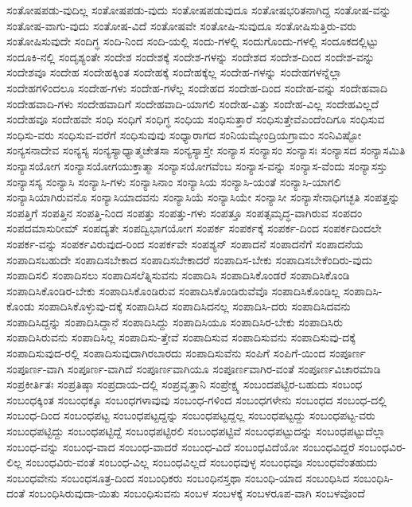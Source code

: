 {ಸಂತೋಷಪಡು-ವುದಿಲ್ಲ
ಸಂತೋಷಪಡು-ವುದು
ಸಂತೋಷಪಡುವುದೂ
ಸಂತೋಷಭರಿತನಾಗಿದ್ದ
ಸಂತೋಷ-ವನ್ನು
ಸಂತೋಷ-ವಾಗು-ವುದು
ಸಂತೋಷ-ವಿದೆ
ಸಂತೋಷವೇ
ಸಂತೋಷಿ-ಸುವುದೂ
ಸಂತೋಷಿಸುತ್ತಿರು-ವರು
ಸಂತೋಷಿಸುವುದೇ
ಸಂದಿಗ್ಧ
ಸಂದಿ-ನಿಂದ
ಸಂದಿ-ಯಲ್ಲಿ
ಸಂದು-ಗಳಲ್ಲಿ
ಸಂದುಗೊಂದು-ಗಳಲ್ಲಿ
ಸಂದೂಕದಲ್ಲಿಟ್ಟು
ಸಂದೂಕಿ-ನಲ್ಲಿ
ಸಂದೃಶ್ಯಂತೇ
ಸಂದೇಶ
ಸಂದೇಶಕ್ಕೆ
ಸಂದೇಶ-ಗಳನ್ನು
ಸಂದೇಶದ
ಸಂದೇಶ-ದಿಂದ
ಸಂದೇಶ-ವನ್ನು
ಸಂದೇಶವೂ
ಸಂದೇಹ
ಸಂದೇಹಕ್ಕಿಂತ
ಸಂದೇಹಕ್ಕೆ
ಸಂದೇಹಕ್ಕೆಲ್ಲ
ಸಂದೇಹ-ಗಳನ್ನು
ಸಂದೇಹಗಳನ್ನೆಲ್ಲಾ
ಸಂದೇಹಗಳಿಂದಲೂ
ಸಂದೇಹ-ಗಳು
ಸಂದೇಹ-ಗಳೆಲ್ಲ
ಸಂದೇಹದ
ಸಂದೇಹ-ದಿಂದ
ಸಂದೇಹ-ವನ್ನು
ಸಂದೇಹವಾದಿ
ಸಂದೇಹವಾದಿ-ಗಳು
ಸಂದೇಹವಾದಿಗೆ
ಸಂದೇಹವಾದಿ-ಯಾಗಲಿ
ಸಂದೇಹ-ವಿತ್ತು
ಸಂದೇಹ-ವಿಲ್ಲ
ಸಂದೇಹವಿಲ್ಲದೆ
ಸಂದೇಹವೂ
ಸಂದೇಹವೇ
ಸಂಧಿ
ಸಂಧಿಗೆ
ಸಂಧಿಗ್ಧ
ಸಂಧಿಯ
ಸಂಧಿಸುತ್ತಾರೆ
ಸಂಧಿಸುತ್ತೇವೆಎಂದೆಂದಿಗೂ
ಸಂಧಿಸುವ
ಸಂಧಿಸು-ವರು
ಸಂಧಿಸುವ-ವರೆಗೆ
ಸಂಧಿಸುವುವು
ಸಂಧ್ಯಾರಾಗದ
ಸಂನಿಯಮ್ಯೇಂದ್ರಿಯಗ್ರಾಮಂ
ಸಂನಿವಿಷ್ಟೋ
ಸಂನ್ಯಸನಾದೇವ
ಸಂನ್ಯಸ್ಯ
ಸಂನ್ಯಸ್ಯಾಧ್ಯಾತ್ಮಚೇತಸಾ
ಸಂನ್ಯಸ್ಯಾಸ್ತೇ
ಸಂನ್ಯಾಸ
ಸಂನ್ಯಾಸಂ
ಸಂನ್ಯಾಸಃ
ಸಂನ್ಯಾಸದ
ಸಂನ್ಯಾಸಮಿತಿ
ಸಂನ್ಯಾಸಯೋಗ
ಸಂನ್ಯಾಸಯೋಗಯುಕ್ತಾತ್ಮಾ
ಸಂನ್ಯಾಸಯೋಗವೆಂಬ
ಸಂನ್ಯಾಸ-ವನ್ನು
ಸಂನ್ಯಾಸ-ವೆಂದು
ಸಂನ್ಯಾಸಸ್ತು
ಸಂನ್ಯಾಸಸ್ಯ
ಸಂನ್ಯಾಸಿ
ಸಂನ್ಯಾಸಿ-ಗಳು
ಸಂನ್ಯಾಸಿನಾಂ
ಸಂನ್ಯಾಸಿಯ
ಸಂನ್ಯಾಸಿ-ಯಂತೆ
ಸಂನ್ಯಾಸಿ-ಯಾಗಲಿ
ಸಂನ್ಯಾಸಿಯಾಗಿರುವನೊ
ಸಂನ್ಯಾಸಿಯಾದವನು
ಸಂನ್ಯಾಸಿಯೆ
ಸಂನ್ಯಾಸಿಯೇ
ಸಂನ್ಯಾಸೀ
ಸಂನ್ಯಾಸೇನಾಧಿಗಚ್ಛತಿ
ಸಂಪತ್ತನ್ನು
ಸಂಪತ್ತಿಗೆ
ಸಂಪತ್ತಿನ
ಸಂಪತ್ತಿ-ನಿಂದ
ಸಂಪತ್ತು
ಸಂಪತ್ತು-ಗಳು
ಸಂಪತ್ತೂ
ಸಂಪತ್ಸಮೃದ್ಧ-ವಾಗಿರುವ
ಸಂಪದಂ
ಸಂಪದಮಾಸುರೀಮ್
ಸಂಪದ್ಯತೇ
ಸಂಪದ್ವಿಭಾಗಯೋಗ
ಸಂಪರ್ಕ
ಸಂಪರ್ಕಕ್ಕೆ
ಸಂಪರ್ಕ-ದಿಂದ
ಸಂಪರ್ಕದಿಂದಲೇ
ಸಂಪರ್ಕ-ವನ್ನು
ಸಂಪರ್ಕವಿರುವುದ-ರಿಂದ
ಸಂಪರ್ಕವೇ
ಸಂಪಶ್ಯನ್
ಸಂಪಾದನೆ
ಸಂಪಾದನೆಗೆ
ಸಂಪಾದನೆಯ
ಸಂಪಾದಿಸಬಹುದೇ
ಸಂಪಾದಿಸಬೇಕಾದ
ಸಂಪಾದಿಸಬೇಕಾದರೆ
ಸಂಪಾದಿಸ-ಬೇಕು
ಸಂಪಾದಿಸಬೇಕೆಂದಿರು-ವುದು
ಸಂಪಾದಿಸಲಿ
ಸಂಪಾದಿಸಲು
ಸಂಪಾದಿಸಲೆತ್ನಿಸುವನು
ಸಂಪಾದಿಸಿ
ಸಂಪಾದಿಸಿಕೊಂಡರೆ
ಸಂಪಾದಿಸಿಕೊಂಡಿ
ಸಂಪಾದಿಸಿಕೊಂಡಿರ-ಬೇಕು
ಸಂಪಾದಿಸಿಕೊಂಡಿರುವ
ಸಂಪಾದಿಸಿಕೊಂಡಿರುವೆವೊ
ಸಂಪಾದಿಸಿಕೊಂಡಿಲ್ಲ
ಸಂಪಾದಿಸಿ-ಕೊಂಡು
ಸಂಪಾದಿಸಿಕೊಳ್ಳುವು-ದಕ್ಕೆ
ಸಂಪಾದಿಸಿದ
ಸಂಪಾದಿಸಿದನಲ್ಲ
ಸಂಪಾದಿಸಿ-ದರು
ಸಂಪಾದಿಸಿದವನು
ಸಂಪಾದಿಸಿದ್ದನ್ನು
ಸಂಪಾದಿಸಿದ್ದಾನೆ
ಸಂಪಾದಿಸಿದ್ದು
ಸಂಪಾದಿಸಿಯೂ
ಸಂಪಾದಿಸಿರ-ಬೇಕು
ಸಂಪಾದಿಸಿರು
ಸಂಪಾದಿಸಿರುವನು
ಸಂಪಾದಿಸಿಲ್ಲ
ಸಂಪಾದಿಸು-ತ್ತೇವೆ
ಸಂಪಾದಿಸುವ
ಸಂಪಾದಿಸುವನು
ಸಂಪಾದಿಸುವು-ದಕ್ಕೆ
ಸಂಪಾದಿಸುವುದ-ರಲ್ಲಿ
ಸಂಪಾದಿಸುವುದಾಗಿರಬಾರದು
ಸಂಪಾದಿಸುವೆನು
ಸಂಪಿಗೆ
ಸಂಪಿಗೆ-ಯಿಂದ
ಸಂಪೂರ್ಣ
ಸಂಪೂರ್ಣ-ವಾಗಿ
ಸಂಪೂರ್ಣ-ವಾಗಿದೆ
ಸಂಪೂರ್ಣವಾಗಿಯೂ
ಸಂಪೂರ್ಣವಾಗಿರ-ವಂತೆ
ಸಂಪೂರ್ಣವಿಚಾರಮಾಡಿ
ಸಂಪ್ರಕೀರ್ತಿತಃ
ಸಂಪ್ರತಿಷ್ಠಾ
ಸಂಪ್ರದಾಯ-ದಲ್ಲಿ
ಸಂಪ್ರವೃತ್ತಾನಿ
ಸಂಪ್ರೇಕ್ಷ್ಯ
ಸಂಬಂದಪಟ್ಟಿರ-ಬಹುದು
ಸಂಬಂಧ
ಸಂಬಂಧಕ್ಕಿಂತ
ಸಂಬಂಧಕ್ಕೂ
ಸಂಬಂಧಗಳಾವುವು
ಸಂಬಂಧ-ಗಳಿಂದ
ಸಂಬಂಧಗಳೇನು
ಸಂಬಂಧದ
ಸಂಬಂಧ-ದಲ್ಲಿ
ಸಂಬಂಧ-ದಿಂದ
ಸಂಬಂಧಪಟ್ಟ
ಸಂಬಂಧಪಟ್ಟದ್ದನ್ನು
ಸಂಬಂಧಪಟ್ಟದ್ದಲ್ಲ
ಸಂಬಂಧಪಟ್ಟದ್ದು
ಸಂಬಂಧಪಟ್ಟ-ವರು
ಸಂಬಂಧಪಟ್ಟಿದ್ದು
ಸಂಬಂಧಪಟ್ಟಿದ್ದೆ
ಸಂಬಂಧಪಟ್ಟಿರಲಿ
ಸಂಬಂಧಪಟ್ಟಿವೆ
ಸಂಬಂಧಪಟ್ಟುದನ್ನು
ಸಂಬಂಧಪಟ್ಟುದೆಲ್ಲಾ
ಸಂಬಂಧ-ವನ್ನು
ಸಂಬಂಧ-ವಾದ
ಸಂಬಂಧ-ವಾದರೆ
ಸಂಬಂಧ-ವಿದೆ
ಸಂಬಂಧವಿದೆಯೋ
ಸಂಬಂಧವಿದ್ದರೆ
ಸಂಬಂಧವಿರ-ಲಿಲ್ಲ
ಸಂಬಂಧವಿರು-ವಂತೆ
ಸಂಬಂಧ-ವಿಲ್ಲ
ಸಂಬಂಧವಿಲ್ಲದೆ
ಸಂಬಂಧವುಳ್ಳ
ಸಂಬಂಧವೂ
ಸಂಬಂಧವೆಂತಹುದು
ಸಂಬಂಧವೇನು
ಸಂಬಂಧಸೂತ್ರ-ದಿಂದ
ಸಂಬಂಧಿಕರು
ಸಂಬಂಧಿನಸ್ತಥಾ
ಸಂಬಂಧಿ-ಯಾದ
ಸಂಬಂಧಿಸಿದ
ಸಂಬಂಧಿಸಿ-ದಂತೆ
ಸಂಬಂಧಿಸಿರುವುದಾ-ಯಿತು
ಸಂಬಂಧಿಸುವನು
ಸಂಬಳ
ಸಂಬಳಕ್ಕೆ
ಸಂಬಳರೂಪ-ವಾಗಿ
ಸಂಬಳವೊಂದೆ
}

